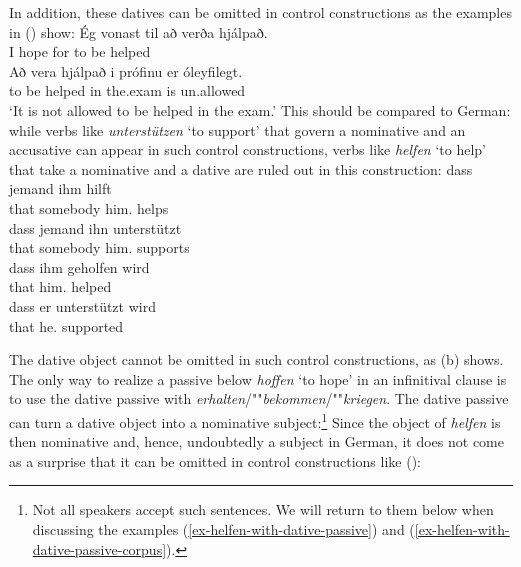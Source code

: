 In addition, these datives can be omitted in control constructions as the examples in () show:
\eal
\ex
\gll Ég vonast til að verða hjálpað.\\
     I  hope   for to be helped\\\icelandic
\ex
\gll Að vera hjálpað i prófinu er óleyfilegt.\\
     to be helped in the.exam is un.allowed\\
\glt `It is not allowed to be helped in the exam.'
\zl
This should be compared to German: while verbs like \emph{unterstützen} `to support' that govern a
nominative and an accusative can appear in such control constructions, verbs like \emph{helfen} `to
help' that take a nominative and a dative are ruled out in this construction:
\eal
\ex 
\gll dass jemand ihm hilft\\
     that somebody him.\DAT{} helps\\\german
\ex
\gll dass jemand ihn unterstützt\\
     that somebody him.\ACC{} supports\\
\ex
\gll  dass ihm geholfen wird\\
      that him.\DAT{} helped \AUX\\
\ex
\gll  dass er unterstützt wird\\
      that he.\NOM{} supported \AUX\\
\zl

\eal
{}
\zl
The dative object cannot be omitted in such control constructions, as (b) shows. The only way
to realize a passive below \emph{hoffen} `to hope' in an infinitival clause is to use the dative passive with
\emph{erhalten}/""\emph{bekommen}/""\emph{kriegen}. The dative passive can turn a dative object into a
nominative subject:\footnote{
  Not all speakers accept such sentences. We will return to them below when discussing the examples
  (\ref{ex-helfen-with-dative-passive}) and (\ref{ex-helfen-with-dative-passive-corpus}).
}
\z
Since the object of \emph{helfen} is then nominative and, hence, undoubtedly a subject in German, it
does not come as a surprise that it can be omitted in control constructions like ():
\z



